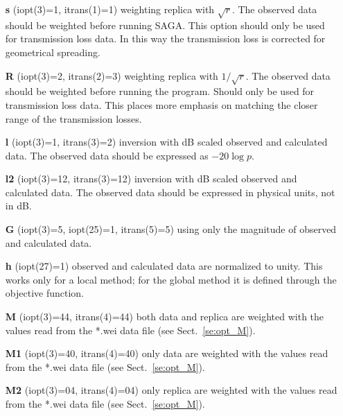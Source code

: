 \documentclass{saclantc}
\begin{document}
\begin{itemize}
    \item[{\bf s}] (iopt(3)=1, itrans(1)=1)  weighting replica  with $\sqrt{r}$. 
The observed data should be weighted before running {\sf SAGA}. 
This option should only be used for transmission loss data.
In this way the transmission loss is corrected for geometrical spreading.
\vspace{-0.3cm}

    \item[{\bf R}] (iopt(3)=2, itrans(2)=3)  weighting replica with $1/ \sqrt{r}$.
The observed data should be weighted before running the program. Should only
be used for transmission loss data.
 This places more
emphasis on matching the closer range of the transmission losses.
\vspace{-0.3cm}
    \item[{\bf l}] (iopt(3)=1, itrans(3)=2) inversion  with  dB scaled observed
and calculated data. The  observed data should be expressed as $-20 \log p $.
\vspace{-0.3cm}
    \item[{\bf l2}] (iopt(3)=12, itrans(3)=12) inversion  with  dB scaled observed
and calculated data. The  observed data should be expressed in
    physical units, not in dB.
\vspace{-0.3cm}
    \item[{\bf G}] (iopt(3)=5, iopt(25)=1, itrans(5)=5) using only the magnitude of
observed and calculated data.
\vspace{-0.3cm}
    \item[{\bf h}] (iopt(27)=1)     observed and calculated
data are normalized to unity. This works only for a local method; for the
global method it is defined through the objective function. 
\vspace{-0.3cm}
    \item[{\bf M}] (iopt(3)=44, itrans(4)=44) both data and replica are 
weighted with the values read from the *.wei data file
(see Sect.\ \ref{se:opt_M}).
\vspace{-0.3cm}
    \item[{\bf M1}] (iopt(3)=40, itrans(4)=40) only  data are 
weighted with the values read from the *.wei data file
(see Sect.\ \ref{se:opt_M}).
\vspace{-0.3cm}
    \item[{\bf M2}] (iopt(3)=04, itrans(4)=04) only replica are 
weighted with the values read from the *.wei data file (see Sect.\ \ref{se:opt_M}).
\end{itemize}
\end{document}
